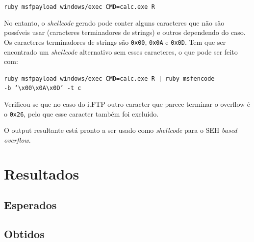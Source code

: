 \documentclass[a4paper]{article}
\begin{document}
	\texttt{ruby msfpayload windows/exec CMD=calc.exe R}

No entanto, o \textit{shellcode} gerado pode conter alguns caracteres que não são possíveis usar (caracteres terminadores de strings) e outros dependendo do caso. Os caracteres terminadores de strings são \texttt{0x00}, \texttt{0x0A} e \texttt{0x0D}. Tem que ser encontrado um \textit{shellcode} alternativo sem esses caracteres, o que pode ser feito com:

	\texttt{ruby msfpayload windows/exec CMD=calc.exe R | ruby msfencode \\ -b `\textbackslash x00\textbackslash x0A\textbackslash x0D' -t c}

Verificou-se que no caso do i.FTP outro caracter que parece terminar o overflow é o \texttt{0x26}, pelo que esse caracter também foi excluído.

O output resultante está pronto a ser usado como \textit{shellcode} para o SEH \textit{based overflow}.


\pagebreak
\section{Resultados}

\subsection{Esperados}
\subsection{Obtidos}


\pagebreak

\nocite{CorelanTeam, refx86asm, genSEHexploits, AMD64vol3_2013}
\end{document}
